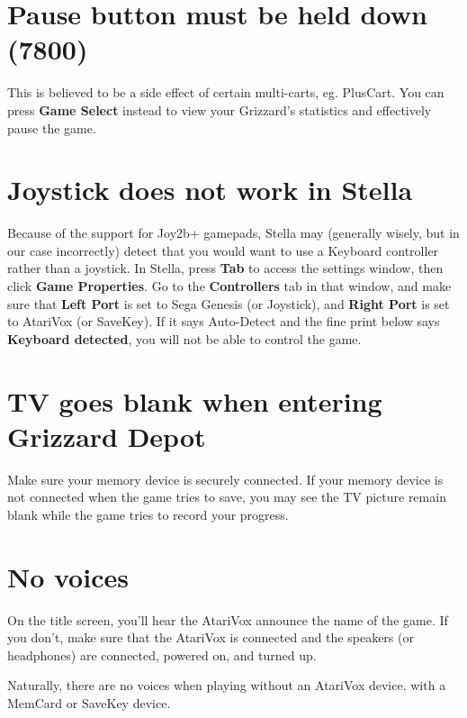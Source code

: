 \documentclass[9pt,twocolumn,openany,article,crop]{memoir}
\begin{document}
\section*{Pause button must be held down (7800)}

This  is believed  to  be  a side  effect  of  certain multi-carts,  eg.
PlusCart.  You  can press  \textbf{Game  Select}  instead to  view  your
Grizzard's statistics and effectively pause the game.

\section*{Joystick does not work in Stella}

Because  of  the support  for  Joy2b+  gamepads, Stella  may  (generally
wisely, but in  our case incorrectly) detect that you  would want to use
a  Keyboard  controller  rather  than   a  joystick.  In  Stella,  press
\textbf{Tab}  to access  the  settings window,  then click  \textbf{Game
  Properties}. Go  to the \textbf{Controllers}  tab in that  window, and
make sure that \textbf{Left Port} is  set to Sega Genesis (or Joystick),
and \textbf{Right  Port} is  set to  AtariVox (or  SaveKey). If  it says
Auto-Detect and  the fine  print below says  \textbf{Keyboard detected},
you will not be able to control the game.

\fi

\ifdefined\NOSAVE\else\ifdefined\ATARIAGESAVE\else

\section*{TV goes blank when entering Grizzard Depot}

Make  sure your  memory device  is  securely connected.  If your  memory
device is not connected when the game  tries to save, you may see the TV
picture remain blank while the game tries to record your progress.

\fi

\section*{No voices}

On the title  screen, you'll hear the AtariVox announce  the name of the
game. If  you don't, make  sure that the  AtariVox is connected  and the
speakers (or headphones) are connected, powered on, and turned up.

Naturally,  there are  no  voices  when playing  \ifdefined\ATARIAGESAVE
without an AtariVox device. \else with a MemCard or SaveKey device. \fi
\end{document}
